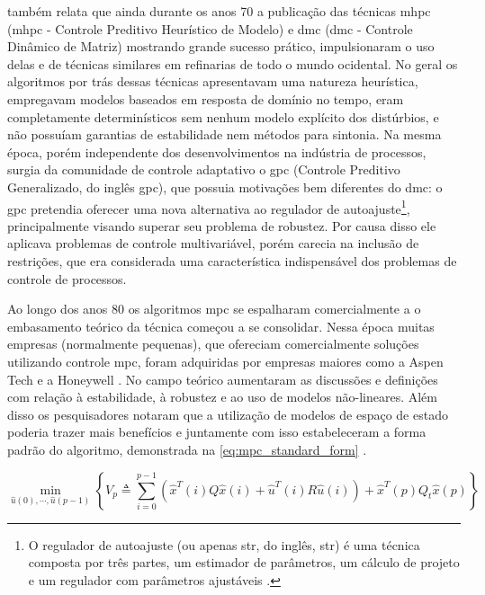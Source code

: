  também relata que ainda durante os anos 70 a publicação das técnicas
\acrlong{mhpc} (\acrshort{mhpc} - Controle Preditivo Heurístico de Modelo) e
\acrlong{dmc} (\acrshort{dmc} - Controle Dinâmico de Matriz) mostrando grande sucesso prático,
impulsionaram o uso delas e de técnicas similares em refinarias de todo o mundo ocidental.
No geral os algoritmos por trás dessas técnicas apresentavam uma natureza heurística,
empregavam modelos baseados em resposta de domínio no tempo, eram completamente determinísticos
sem nenhum modelo explícito dos distúrbios, e não possuíam garantias de estabilidade nem
métodos para sintonia. Na mesma época, porém independente dos desenvolvimentos na indústria
de processos, surgia da comunidade de controle adaptativo o \acrshort{gpc} (Controle Preditivo
Generalizado, do inglês \acrlong{gpc}), que possuia motivações bem diferentes do \acrshort{dmc}:
o \acrshort{gpc} pretendia oferecer uma nova alternativa ao regulador de autoajuste\footnote{
    O regulador de autoajuste (ou apenas \acrshort{str}, do inglês, \acrlong{str}) é uma técnica composta
    por três partes, um estimador de parâmetros, um cálculo de projeto e um regulador com
    parâmetros ajustáveis \cite{Astrom1985}.
}, 
principalmente visando superar seu problema de robustez. Por causa disso ele aplicava problemas de controle
multivariável, porém carecia na inclusão de restrições, que era considerada uma característica
indispensável dos problemas de controle de processos.

Ao longo dos anos 80 os algoritmos \acrshort{mpc} se espalharam comercialmente a o embasamento
teórico da técnica começou a se consolidar. Nessa época muitas empresas (normalmente pequenas),
que ofereciam comercialmente soluções utilizando controle \acrshort{mpc}, foram adquiridas por
empresas maiores como a Aspen Tech e a Honeywell \cite{Lee2011}. No campo teórico aumentaram as discussões e
definições com relação à estabilidade, à robustez e ao uso de modelos não-lineares. Além disso
os pesquisadores notaram que a utilização de modelos de espaço de estado poderia trazer mais
benefícios e juntamente com isso estabeleceram a forma padrão do algoritmo, demonstrada na
\cref{eq:mpc_standard_form} \cite{Lee2011} .

\begin{equation}
	\label{eq:mpc_standard_form}
    \min_{\hat{u}(0),\cdots,\hat{u}(p-1)}
    \left\{
        V_p \triangleq \displaystyle\sum_{i=0}^{p-1}
            \left(\hat{x}^T(i)Q\hat{x}(i) + \hat{u}^T(i)R\hat{u}(i) \right)
            + \hat{x}^T(p)Q_t\hat{x}(p)
    \right\}
\end{equation}

